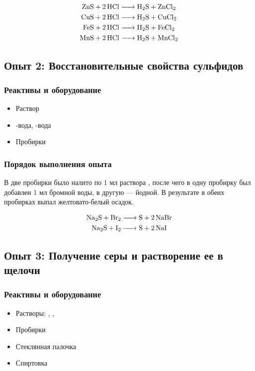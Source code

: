 \documentclass[a4paper, 12pt]{article}
\begin{document}
\begin{align}
	\ce{ZnS + 2HCl &-> H2S + ZnCl2}\\
	\ce{CuS + 2HCl &-> H2S + CuCl2}\\
	\ce{FeS + 2HCl &-> H2S + FeCl2}\\
	\ce{MnS + 2HCl &-> H2S + MnCl2}
\end{align}

\subsection{Опыт 2: Восстановительные свойства сульфидов}

\subsubsection{Реактивы и оборудование}

\begin{itemize}
	\item Раствор 
	
	\item {}-вода, -вода
	
	\item Пробирки
\end{itemize}

\subsubsection{Порядок выполнения опыта}

В две пробирки было налито по 1 мл раствора , после чего в одну пробирку был добавлен 1 мл бромной воды, в другую --- йодной. В результате в обеих пробирках выпал желтовато-белый осадок.

\begin{align}
	\ce{Na2S + Br2 &-> S + 2NaBr}\\
	\ce{Na2S + I2 &-> S + 2NaI}
\end{align}

\subsection{Опыт 3: Получение серы и растворение ее в щелочи}

\subsubsection{Реактивы и оборудование}

\begin{itemize}
	\item Растворы: , , 
	
	\item Пробирки
	
	\item Стеклянная палочка
	
	\item Спиртовка
\end{itemize}
\end{document}
